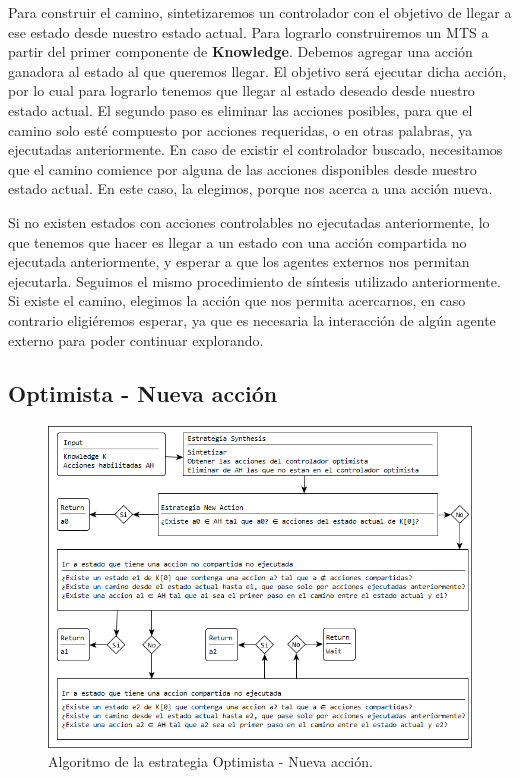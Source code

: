 Para construir el camino, sintetizaremos un controlador con el objetivo de llegar a ese estado desde nuestro estado actual. Para lograrlo construiremos un MTS 
a partir del primer componente de \textbf{Knowledge}. Debemos agregar una acción ganadora al estado al que queremos llegar. El objetivo será ejecutar dicha acción, 
por lo cual para lograrlo tenemos que llegar al estado deseado desde nuestro estado actual. El segundo paso es eliminar las acciones posibles, para que el camino 
solo esté compuesto por acciones requeridas, o en otras palabras, ya ejecutadas anteriormente. En caso de existir el controlador buscado, necesitamos que el camino 
comience por alguna de las acciones disponibles desde nuestro estado actual. En este caso, la elegimos, porque nos acerca a una acción nueva.


Si no existen estados con acciones controlables no ejecutadas anteriormente, lo que tenemos que hacer es llegar a un estado con una acción compartida no ejecutada 
anteriormente, y esperar a que los agentes externos nos permitan ejecutarla. Seguimos el mismo procedimiento de síntesis utilizado anteriormente. Si existe el camino, 
elegimos la acción que nos permita acercarnos, en caso contrario eligiéremos esperar, ya que es necesaria la interacción de algún agente externo para poder continuar 
explorando.

\subsection{Optimista - Nueva acción}

\begin{figure}[H]
  \centering
    \includegraphics[scale=0.8]{Imagenes/Algoritmo/Algoritmo_elegir_2.png}
  \caption{Algoritmo de la estrategia Optimista - Nueva acción.}
  \label{fig:Algoritmo_elegir_2}
\end{figure}

